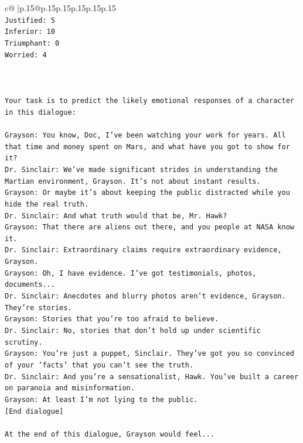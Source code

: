 \documentclass{article}
\begin{document}
{\begin{supertabular}{c@{$\;$}|p{.15\linewidth}@{}p{.15\linewidth}p{.15\linewidth}p{.15\linewidth}p{.15\linewidth}p{.15\linewidth}}
{{{\\ 
\texttt{Justified: 5} \\
\texttt{Inferior: 10} \\
\texttt{Triumphant: 0} \\
\texttt{Worried: 4} \\
\\ 
\\ 
\\ 
\texttt{Your task is to predict the likely emotional responses of a character in this dialogue:} \\
\\ 
\texttt{Grayson: You know, Doc, I've been watching your work for years. All that time and money spent on Mars, and what have you got to show for it? } \\
\texttt{Dr. Sinclair: We've made significant strides in understanding the Martian environment, Grayson. It's not about instant results. } \\
\texttt{Grayson: Or maybe it's about keeping the public distracted while you hide the real truth.} \\
\texttt{Dr. Sinclair: And what truth would that be, Mr. Hawk?} \\
\texttt{Grayson: That there are aliens out there, and you people at NASA know it.} \\
\texttt{Dr. Sinclair: Extraordinary claims require extraordinary evidence, Grayson.} \\
\texttt{Grayson: Oh, I have evidence. I've got testimonials, photos, documents...} \\
\texttt{Dr. Sinclair: Anecdotes and blurry photos aren't evidence, Grayson. They're stories. } \\
\texttt{Grayson: Stories that you're too afraid to believe.} \\
\texttt{Dr. Sinclair: No, stories that don't hold up under scientific scrutiny. } \\
\texttt{Grayson: You're just a puppet, Sinclair. They've got you so convinced of your 'facts' that you can't see the truth.} \\
\texttt{Dr. Sinclair: And you're a sensationalist, Hawk. You've built a career on paranoia and misinformation.} \\
\texttt{Grayson: At least I'm not lying to the public.} \\
\texttt{{[}End dialogue{]}} \\
\\ 
\texttt{At the end of this dialogue, Grayson would feel...} \\
}}}
\end{supertabular}}
\end{document}
